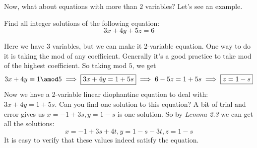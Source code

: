\documentclass[11pt]{scrartcl}
\begin{document}
Now, what about equations with more than \(2\) variables? Let's see an example.
\begin{exercise}
Find all integer solutions of the following equation:
\[3x+4y+5z=6\]
\end{exercise}
\begin{soln}
Here we have 3 variables, but we can make it 2-variable equation. One way to do it is taking the mod of any coefficient. Generally it's a good practice to take mod of the highest coefficient. So taking mod \(5\), we get
\[3x + 4y \equiv 1 \amod 5 \implies \boxed{3x + 4y = 1 + 5s} \implies 6 - 5z = 1+5s \implies \boxed{ z = 1-s}\]
Now we have a 2-variable linear diophantine equation to deal with: \(3x + 4y = 1 + 5s\). Can you find one solution to this equation? A bit of trial and error gives us \(x = -1+3s , y = 1-s\) is one solution. So by \textit{Lemma 2.3} we can get all the solutions:
\[x = -1+3s + 4t , y = 1-s -3t , z = 1-s\]
It is easy to verify that these values indeed satisfy the equation. 
\end{soln}
\end{document}
